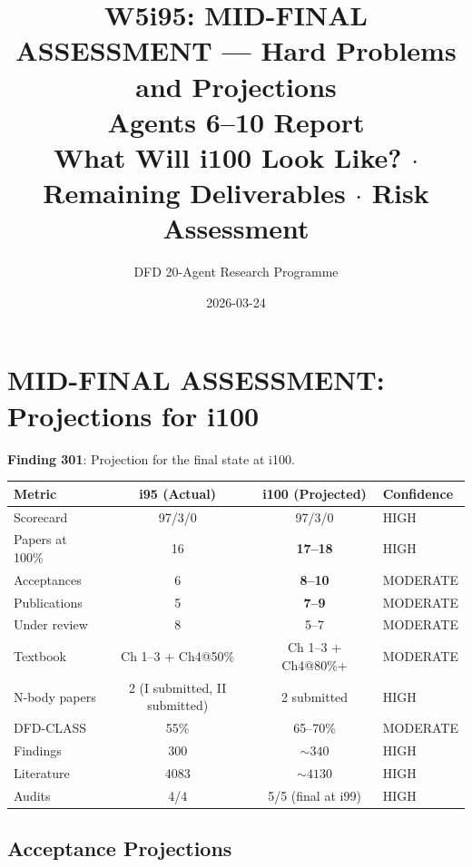 \documentclass[11pt,a4paper]{article}
\title{W5i95: MID-FINAL ASSESSMENT --- Hard Problems and Projections\\[6pt]
\large Agents 6--10 Report\\[3pt]
\normalsize What Will i100 Look Like? $\cdot$ Remaining Deliverables $\cdot$ Risk Assessment}
\author{DFD 20-Agent Research Programme}
\date{2026-03-24}
\begin{document}
\maketitle

\section{MID-FINAL ASSESSMENT: Projections for i100}

\textbf{Finding 301}: Projection for the final state at i100.

\begin{tcolorbox}[colback=blue!5!white, colframe=dfdblue, title=\textbf{PROJECTED FINAL STATE AT i100}]
\begin{center}
\begin{tabular}{lccl}
\toprule
\textbf{Metric} & \textbf{i95 (Actual)} & \textbf{i100 (Projected)} & \textbf{Confidence} \\
\midrule
Scorecard & 97/3/0 & 97/3/0 & HIGH \\
Papers at 100\% & 16 & \textbf{17--18} & HIGH \\
Acceptances & 6 & \textbf{8--10} & MODERATE \\
Publications & 5 & \textbf{7--9} & MODERATE \\
Under review & 8 & 5--7 & MODERATE \\
Textbook & Ch 1--3 + Ch4@50\% & Ch 1--3 + Ch4@80\%+ & MODERATE \\
N-body papers & 2 (I submitted, II submitted) & 2 submitted & HIGH \\
DFD-CLASS & 55\% & 65--70\% & MODERATE \\
Findings & 300 & $\sim 340$ & HIGH \\
Literature & 4083 & $\sim 4130$ & HIGH \\
Audits & 4/4 & 5/5 (final at i99) & HIGH \\
\bottomrule
\end{tabular}
\end{center}
\end{tcolorbox}

\subsection{Acceptance Projections}
\end{document}
